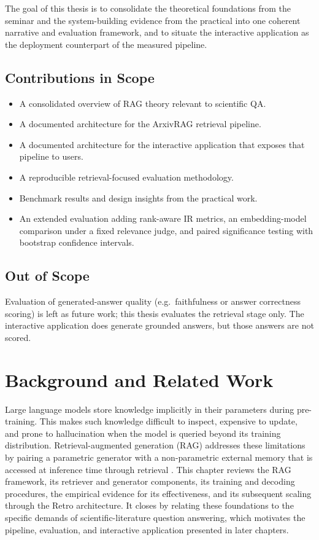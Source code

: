 \documentclass[12pt,a4paper,titlepage,oneside]{book}
\begin{document}
The goal of this thesis is to consolidate the theoretical foundations from the seminar and the system-building evidence from the practical into one coherent narrative and evaluation framework, and to situate the interactive application as the deployment counterpart of the measured pipeline.

\section*{Contributions in Scope}
\begin{itemize}
    \item A consolidated overview of RAG theory relevant to scientific QA.
    \item A documented architecture for the ArxivRAG retrieval pipeline.
    \item A documented architecture for the interactive application that exposes that pipeline to users.
    \item A reproducible retrieval-focused evaluation methodology.
    \item Benchmark results and design insights from the practical work.
    \item An extended evaluation adding rank-aware IR metrics, an embedding-model comparison under a fixed relevance judge, and paired significance testing with bootstrap confidence intervals.
\end{itemize}

\section*{Out of Scope}
Evaluation of generated-answer quality (e.g.\ faithfulness or answer correctness scoring) is left as future work; this thesis evaluates the retrieval stage only. The interactive application does generate grounded answers, but those answers are not scored.

\chapter{Background and Related Work}

Large language models store knowledge implicitly in their parameters during pre-training. This makes such knowledge difficult to inspect, expensive to update, and prone to hallucination when the model is queried beyond its training distribution. Retrieval-augmented generation (RAG) addresses these limitations by pairing a parametric generator with a non-parametric external memory that is accessed at inference time through retrieval \cite{lewis2020rag}. This chapter reviews the RAG framework, its retriever and generator components, its training and decoding procedures, the empirical evidence for its effectiveness, and its subsequent scaling through the Retro architecture. It closes by relating these foundations to the specific demands of scientific-literature question answering, which motivates the pipeline, evaluation, and interactive application presented in later chapters.
\end{document}
